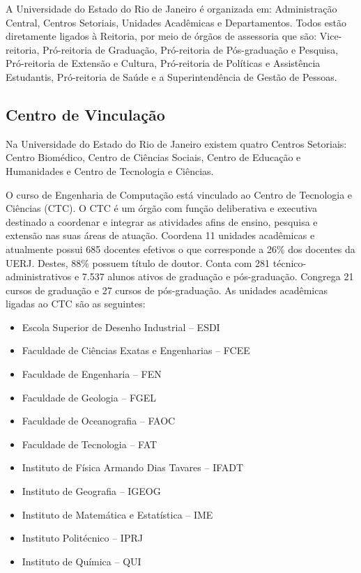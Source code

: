 A Universidade do Estado do Rio de Janeiro é organizada em: Administração Central, Centros Setoriais, Unidades Acadêmicas e Departamentos. Todos estão diretamente ligados à Reitoria, por meio de órgãos de assessoria que são: Vice-reitoria, Pró-reitoria de Graduação, Pró-reitoria de Pós-graduação e Pesquisa, Pró-reitoria de Extensão e Cultura, Pró-reitoria de Políticas e Assistência Estudantis, Pró-reitoria de Saúde e a Superintendência de Gestão de Pessoas.

\subsection{Centro de Vinculação}

Na Universidade do Estado do Rio de Janeiro existem quatro Centros Setoriais: Centro Biomédico, Centro de Ciências Sociais, Centro de Educação e Humanidades e Centro de Tecnologia e Ciências.

O curso de Engenharia de Computação está vinculado ao Centro de Tecnologia e Ciências (CTC).
O CTC é um órgão com função deliberativa e executiva destinado a coordenar e integrar as atividades afins de ensino, pesquisa e extensão nas suas áreas de atuação. Coordena 11 unidades acadêmicas e atualmente possui 685 docentes efetivos o que corresponde a 26\% dos docentes da UERJ. Destes, 88\% possuem título de doutor. Conta com 281 técnico-administrativos e 7.537 alunos ativos de graduação e pós-graduação. Congrega 21 cursos de graduação e 27 cursos de pós-graduação. As unidades acadêmicas ligadas ao CTC são as seguintes:

\begin{itemize}

	\item Escola Superior de Desenho Industrial -- ESDI
	\item Faculdade de Ciências Exatas e Engenharias -- FCEE
	\item Faculdade de Engenharia -- FEN
	\item Faculdade de Geologia -- FGEL
	\item Faculdade de Oceanografia -- FAOC
	\item Faculdade de Tecnologia -- FAT
	\item Instituto de Física Armando Dias Tavares -- IFADT
	\item Instituto de Geografia -- IGEOG
	\item Instituto de Matemática e Estatística -- IME
	\item Instituto Politécnico -- IPRJ
	\item Instituto de Química -- QUI

\end{itemize}

